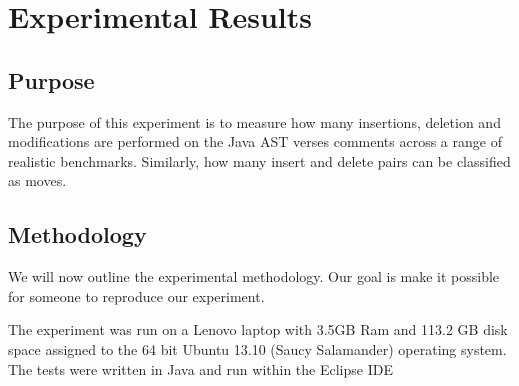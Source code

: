 
\chapter{Experimental Results}

\section{Purpose}
The purpose of this experiment is to measure how many insertions, deletion and modifications are performed on the Java AST verses comments across a range of realistic benchmarks. Similarly, how many insert and delete pairs can be classified as moves. 


\section{Methodology}
We will now outline the experimental methodology. Our goal is make it possible for someone to reproduce our experiment.

The experiment was run on a Lenovo laptop with 3.5GB Ram and 113.2 GB disk space assigned to the 64 bit Ubuntu 13.10 (Saucy Salamander) operating system. The tests were written in Java and run within the Eclipse IDE



 
 

